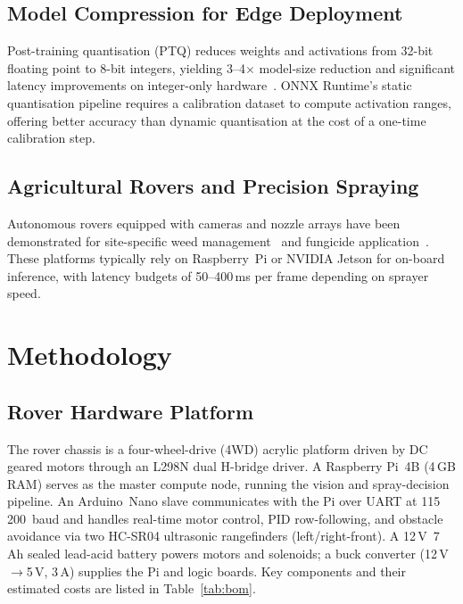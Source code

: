 \documentclass[conference]{IEEEtran}
\begin{document}
\subsection{Model Compression for Edge Deployment}
Post-training quantisation (PTQ) reduces weights and activations from
32-bit floating point to 8-bit integers, yielding 3--4$\times$ model-size
reduction and significant latency improvements on integer-only
hardware~\cite{b6}. ONNX Runtime's static quantisation pipeline requires
a calibration dataset to compute activation ranges, offering better
accuracy than dynamic quantisation at the cost of a one-time calibration
step.

\subsection{Agricultural Rovers and Precision Spraying}
Autonomous rovers equipped with cameras and nozzle arrays have been
demonstrated for site-specific weed management~\cite{b7} and fungicide
application~\cite{b8}. These platforms typically rely on Raspberry~Pi or
NVIDIA Jetson for on-board inference, with latency budgets of
50--400\,ms per frame depending on sprayer speed.

\section{Methodology}
\label{sec:method}

\subsection{Rover Hardware Platform}
\label{sec:hardware}

The rover chassis is a four-wheel-drive (4WD) acrylic platform driven by
DC geared motors through an L298N dual H-bridge driver. A Raspberry
Pi~4B (4\,GB RAM) serves as the master compute node, running the
vision and spray-decision pipeline. An Arduino~Nano slave communicates
with the Pi over UART at 115\,200~baud and handles real-time motor
control, PID row-following, and obstacle avoidance via two HC-SR04
ultrasonic rangefinders (left/right-front). A 12\,V~7\,Ah sealed
lead-acid battery powers motors and solenoids; a buck converter
(12\,V${\to}$5\,V, 3\,A) supplies the Pi and logic boards. Key
components and their estimated costs are listed in
Table~\ref{tab:bom}.
\end{document}
